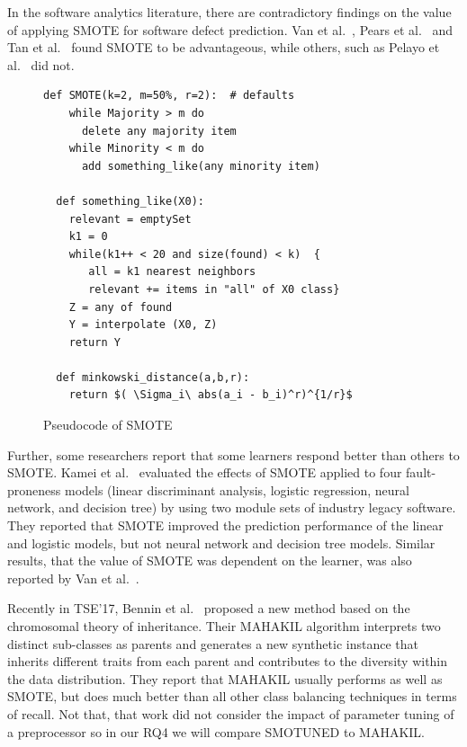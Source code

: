 \documentclass[sigconf]{acmart}
\theoremstyle{break}
\newcommand{\sma}{{\sc SMOTE}}
\newcommand{\smb}{{\sc SMOTUNED}}
\begin{document}
In the software analytics literature, there are contradictory findings on
the value of applying {\sma} for software defect prediction.
Van et al.~\cite{van2007experimental}, Pears et al.~\cite{pears2014synthetic} and Tan et al.~\cite{tan2015online} found {\sma} to be advantageous, while others, such as Pelayo et al.~\cite{pelayo2007applying} did not. 

 \begin{figure}\small
\begin{lstlisting}[mathescape,linewidth=2in,frame=n,numbers=none]
  def SMOTE(k=2, m=50%, r=2):  # defaults
    while Majority > m do
      delete any majority item
    while Minority < m do
      add something_like(any minority item)
      
  def something_like(X0): 
    relevant = emptySet
    k1 = 0
    while(k1++ < 20 and size(found) < k)  {
       all = k1 nearest neighbors
       relevant += items in "all" of X0 class}
    Z = any of found
    Y = interpolate (X0, Z)
    return Y
    
  def minkowski_distance(a,b,r): 
    return $( \Sigma_i\ abs(a_i - b_i)^r)^{1/r}$
\end{lstlisting} 
\vspace{-0.2cm}
\caption{Pseudocode of SMOTE}
\label{fig:pseudocode} 
\vspace{-0.3cm}
\end{figure}

Further, some researchers report that some learners respond better than others to {\sma}. Kamei et al.~\cite{kamei2007effects} evaluated the effects of {\sma} applied to  four fault-proneness models
(linear discriminant analysis, logistic regression, neural network, and decision tree) by
using two module sets of industry legacy software. They reported that {\sma} improved the prediction performance of the linear and logistic models, but not neural network and decision tree models. Similar results, that the value of {\sma} was dependent on the learner,
was also reported by Van et al.~\cite{van2007experimental}.

Recently in TSE'17, Bennin et al.~\cite{bennin2017mahakil}  proposed a new method based on the chromosomal theory of inheritance. 
Their MAHAKIL algorithm interprets two distinct sub-classes as parents and generates a new synthetic instance that inherits different traits from each parent and contributes to the diversity within the data distribution.
They report that MAHAKIL usually performs as well as  {\sma}, but
does much better than all   other class balancing techniques in terms of recall.
Not that, that work did not  consider the impact of parameter tuning of a preprocessor so in our RQ4 we will compare {\smb} to MAHAKIL.
\end{document}
